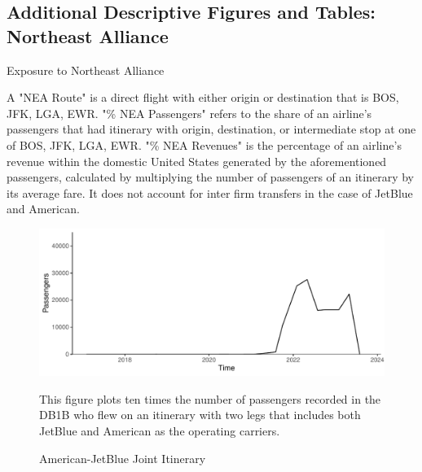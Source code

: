\documentclass{article}
\begin{document}
\begin{appendices}




	\subsection{Additional Descriptive Figures and Tables: Northeast Alliance}
	
	\begin{landscape}
		\begin{table}
			\caption{Exposure to Northeast Alliance}
			\label{tab:NEA_Exposure}
			
			\begin{minipage}{\textwidth} %
				{\footnotesize A "NEA Route" is a direct flight with either origin or destination that is BOS, JFK, LGA, EWR. "\% NEA Passengers" refers to the share of an airline's passengers that had itinerary with origin, destination, or intermediate stop at one of BOS, JFK, LGA, EWR. "\% NEA Revenues"  is the percentage of an airline's revenue within the domestic United States generated by the aforementioned passengers, calculated by multiplying the number of passengers of an itinerary by its average fare. It does not account for inter firm transfers in the case of JetBlue and American.}
			\end{minipage}
		\end{table}
	\end{landscape}
	
		\begin{figure}
		\caption{American-JetBlue Joint Itinerary}
		\label{fig:NEA_Joint_Op}
		\includegraphics[width = \linewidth]{NEA_OPCarrier_Switch_Graph}
		\begin{minipage}{\textwidth} %
			{\footnotesize This figure plots ten times the number of passengers recorded in the DB1B who flew on an itinerary with two legs that includes both JetBlue and American as the operating carriers.}
		\end{minipage}
	\end{figure}
	

\end{appendices}
\end{document}
